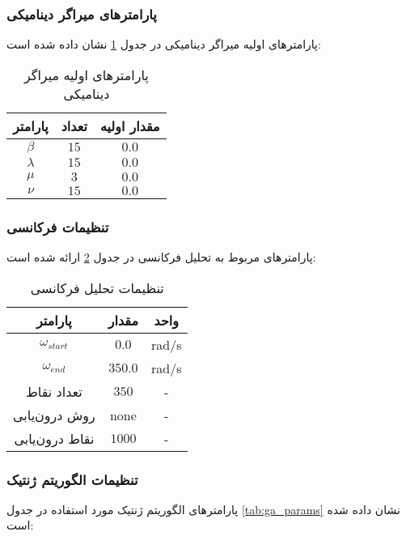 \subsubsection{پارامترهای میراگر دینامیکی}

پارامترهای اولیه میراگر دینامیکی در جدول \ref{tab:dva_params} نشان داده شده است:

\begin{table}[h!]
\centering
\caption{پارامترهای اولیه میراگر دینامیکی}
\label{tab:dva_params}
\begin{tabular}{ccc}
\hline
\textbf{پارامتر} & \textbf{تعداد} & \textbf{مقدار اولیه} \\
\hline
$\beta$ & $15$ & $0.0$ \\
$\lambda$ & $15$ & $0.0$ \\
$\mu$ & $3$ & $0.0$ \\
$\nu$ & $15$ & $0.0$ \\
\hline
\end{tabular}
\end{table}

\subsubsection{تنظیمات فرکانسی}

پارامترهای مربوط به تحلیل فرکانسی در جدول \ref{tab:frequency_params} ارائه شده است:

\begin{table}[h!]
\centering
\caption{تنظیمات تحلیل فرکانسی}
\label{tab:frequency_params}
\begin{tabular}{ccc}
\hline
\textbf{پارامتر} & \textbf{مقدار} & \textbf{واحد} \\
\hline
$\omega_{start}$ & $0.0$ & rad/s \\
$\omega_{end}$ & $350.0$ & rad/s \\
تعداد نقاط & $350$ & - \\
روش درون‌یابی & none & - \\
نقاط درون‌یابی & $1000$ & - \\
\hline
\end{tabular}
\end{table}

\subsubsection{تنظیمات الگوریتم ژنتیک}

پارامترهای الگوریتم ژنتیک مورد استفاده در جدول \ref{tab:ga_params} نشان داده شده است:

